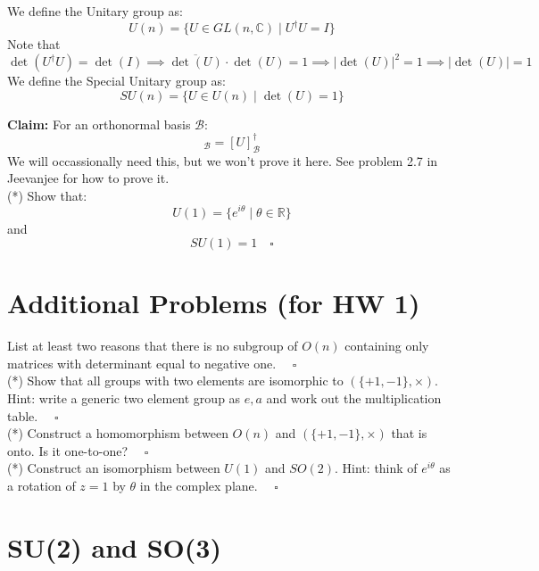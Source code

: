 \documentclass[12pt]{article}
\begin{document}
We define the Unitary group as:
\begin{equation*}
  U(n) = \bigl\{U \in GL(n,\mathbb{C}) \mid U^\dagger U = I\bigr\}
\end{equation*}
Note that
\begin{equation*}
  \det(U^\dagger U) = \det(I)
  \implies \overline{\det(U)}\cdot\det(U) = 1
  \implies |\det(U)|^2 = 1
  \implies |\det(U)| = 1
\end{equation*}
We define the Special Unitary group as:
\begin{equation*}
  SU(n) = \bigl\{U \in U(n) \mid \det(U) = 1\bigr\}
\end{equation*}

\noindent
\textbf{Claim:} For an orthonormal basis $\mathcal{B}$:
\begin{equation*}
  [U^\dagger]_\mathcal{B} = [U]^\dagger_\mathcal{B}
\end{equation*}
We will occassionally need this, but we won't prove it here.  See problem 2.7 in Jeevanjee for how to prove it.\\[5pt]

\exercise (*) Show that:
$$U(1) = \bigl\{e^{i\theta} \mid \theta \in \mathbb{R} \bigr\}$$
and
$$SU(1) = {1} \quad \square $$

\section{Additional Problems (for HW 1)}

\exercise List at least two reasons that there is no subgroup of $O(n)$ containing only matrices with determinant equal to negative one. $\quad \square$ \\[5pt]

\exercise (*) Show that all groups with two elements are isomorphic to $(\{+1,-1\}, \times)$.  Hint: write a generic two element group as ${e, a}$ and work out the multiplication table. $\quad \square$ \\[5pt]

\exercise (*) Construct a homomorphism between $O(n)$ and $(\{+1,-1\}, \times)$
that is onto.  Is it one-to-one? $\quad \square$ \\[5pt]

\exercise (*) Construct an isomorphism between $U(1)$ and $SO(2)$.  Hint: think of $e^{i\theta}$ as a rotation of $z=1$ by $\theta$ in the complex plane. $\quad \square$ \\[5pt]

\section{SU(2) and SO(3)}
\end{document}
